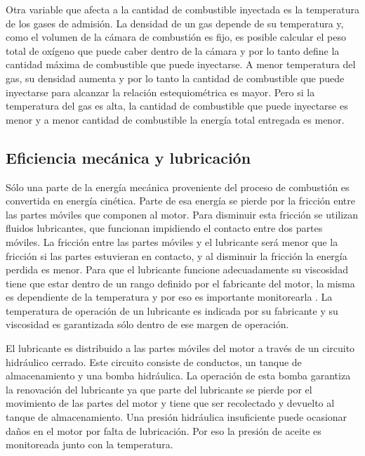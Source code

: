 Otra variable que afecta a la cantidad de combustible inyectada es la temperatura de los gases de admisión. La densidad de un gas depende de su temperatura y, como el volumen de la cámara de combustión es fijo, es posible calcular el peso total de oxígeno que puede caber dentro de la cámara y por lo tanto define la cantidad máxima de combustible que puede inyectarse. A menor temperatura del gas, su densidad aumenta y por lo tanto la cantidad de combustible que puede inyectarse para alcanzar la relación estequiométrica es mayor. Pero si la temperatura del gas es alta, la cantidad de combustible que puede inyectarse es menor y a menor cantidad de combustible la energía total entregada es menor.

\subsection{Eficiencia mecánica y lubricación}

Sólo una parte de la energía mecánica proveniente del proceso de combustión es convertida en energía cinética. Parte de esa energía se pierde por la fricción entre las partes móviles que componen al motor. Para disminuir esta fricción se utilizan fluidos lubricantes, que funcionan impidiendo el contacto entre dos partes móviles. La fricción entre las partes móviles y el lubricante será menor que la fricción si las partes estuvieran en contacto, y al disminuir la fricción la energía perdida es menor. Para que el lubricante funcione adecuadamente su viscosidad tiene que estar dentro de un rango definido por el fabricante del motor, la misma es dependiente de la temperatura y por eso es importante monitorearla \cite{lubrication}. La temperatura de operación de un lubricante es indicada por su fabricante y su viscosidad es garantizada sólo dentro de ese margen de operación.

El lubricante es distribuido a las partes móviles del motor a través de un circuito hidráulico cerrado. Este circuito consiste de conductos, un tanque de almacenamiento y una bomba hidráulica. La operación de esta bomba garantiza la renovación del lubricante ya que parte del lubricante se pierde por el movimiento de las partes del motor y tiene que ser recolectado y devuelto al tanque de almacenamiento. Una presión hidráulica insuficiente puede ocasionar daños en el motor por falta de lubricación. Por eso la presión de aceite es monitoreada junto con la temperatura.

